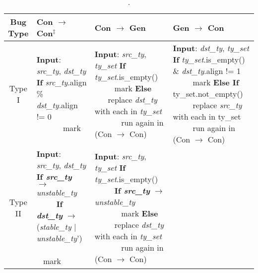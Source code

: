 \begin{table*}[t]
\centering
\caption{.}
\begin{threeparttable}
\footnotesize
\begin{tabular}{c l l l} 
 \toprule
 Bug Type & Con $\rightarrow$ Con$^\ddagger$ & Con $\rightarrow$ Gen  & Gen $\rightarrow$ Con \\ %
 \midrule
 {Type I} &
 
 \thead[l]{
 \textbf{Input}: \textit{src\_ty}, \textit{dst\_ty} \\ 
 \textbf{If} \textit{src\_ty}.align \% \textit{dst\_ty}.align != 0 \\ 
 ~ ~ ~ ~ mark
 } &
 
 \thead[l]{
 \textbf{Input}: \textit{src\_ty}, \textit{ty\_set} \\
 \textbf{If} \textit{ty\_set}.is\_empty() \\ 
 ~ ~ ~ ~ mark \\
 \textbf{Else} \\
 ~ ~ ~ ~ replace \textit{dst\_ty} with each in \textit{ty\_set} \\
 ~ ~ ~ ~ run again in (Con $\rightarrow$ Con)} &

  \thead[l]{
 \textbf{Input}: \textit{dst\_ty}, \textit{ty\_set} \\
 \textbf{If} \textit{ty\_set}.is\_empty() \& \textit{dst\_ty}.align != 1 \\
 ~ ~ ~ ~ mark \\ 
 \textbf{Else If} ty\_set.not\_empty() \\ 
 ~ ~ ~ ~ replace \textit{src\_ty} with each in ty\_set \\
 ~ ~ ~ ~ run again in (Con $\rightarrow$ Con)} \\
 \hline
 {Type II} &
 
 \thead[l]{
 \textbf{Input}: \textit{src\_ty}, \textit{dst\_ty} \\
 \textbf{If \textit{src\_ty}} $\rightarrow$ \textit{unstable\_ty} \\
 ~ ~ ~ ~ \textbf{If \textit{dst\_ty}} $\rightarrow$  (\textit{stable\_ty} | \textit{unstable\_ty}') \\
 ~ ~ ~ ~ ~ ~ ~ ~ mark
 } &
 
 \thead[l]{
 \textbf{Input}: \textit{src\_ty}, \textit{ty\_set} \\
 \textbf{If} \textit{ty\_set}.is\_empty() \\
 ~ ~ ~ ~ \textbf{If \textit{src\_ty}} $\rightarrow$ \textit{unstable\_ty} \\
 ~ ~ ~ ~ ~ ~ ~ ~ mark \\
 \textbf{Else} \\
 ~ ~ ~ ~ replace \textit{dst\_ty} with each in \textit{ty\_set} \\
 ~ ~ ~ ~ run again in (Con $\rightarrow$ Con)} &


\end{tabular}
\end{threeparttable}
\end{table*}
